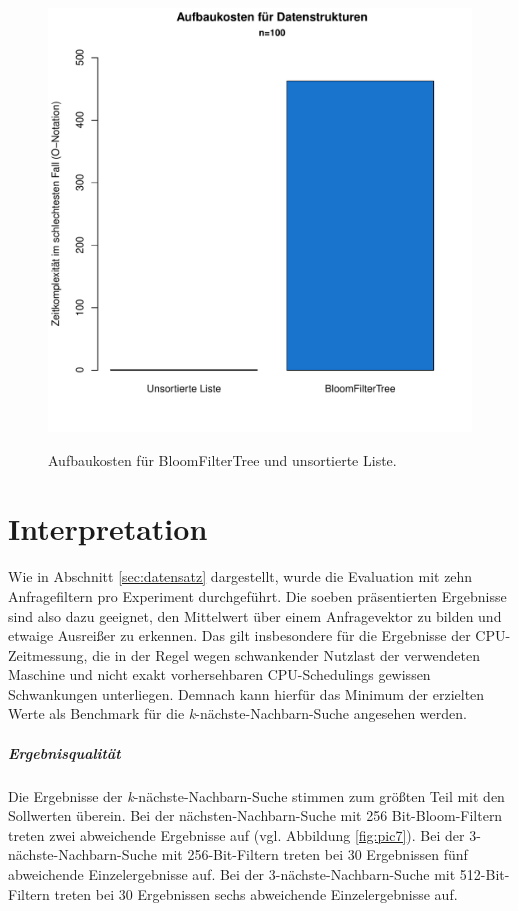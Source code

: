 \begin{figure}[hptb]
	\centering
	\includegraphics[scale=0.7]{pictures/cost.pdf}\\
	\caption[Aufbaukosten für BloomFilterTree und unsortierte Liste]{Aufbaukosten für BloomFilterTree und unsortierte Liste.}\label{fig:pic19}
\end{figure}
\newpage
\section{Interpretation}\label{sec:interpretation}
Wie in Abschnitt \ref{sec:datensatz} dargestellt, wurde die Evaluation mit zehn Anfragefiltern pro Experiment durchgeführt. Die soeben präsentierten Ergebnisse sind also dazu geeignet, den Mittelwert über einem Anfragevektor zu bilden und etwaige Ausreißer zu erkennen. Das gilt insbesondere für die Ergebnisse der CPU-Zeitmessung, die in der Regel wegen schwankender Nutzlast der verwendeten Maschine und nicht exakt vorhersehbaren CPU-Schedulings gewissen Schwankungen unterliegen. Demnach kann hierfür das Minimum der erzielten Werte als Benchmark für die \textit{k}-nächste-Nachbarn-Suche angesehen werden. 
\subparagraph*{Ergebnisqualität}
Die Ergebnisse der \textit{k}-nächste-Nachbarn-Suche stimmen zum größten Teil mit den Sollwerten überein. Bei der nächsten-Nachbarn-Suche mit 256 Bit-Bloom-Filtern treten zwei abweichende Ergebnisse auf (vgl. Abbildung \ref{fig:pic7}). Bei der 3-nächste-Nachbarn-Suche mit 256-Bit-Filtern treten bei 30 Ergebnissen fünf abweichende Einzelergebnisse auf. Bei der 3-nächste-Nachbarn-Suche mit 512-Bit-Filtern treten bei 30 Ergebnissen sechs abweichende Einzelergebnisse auf. 

